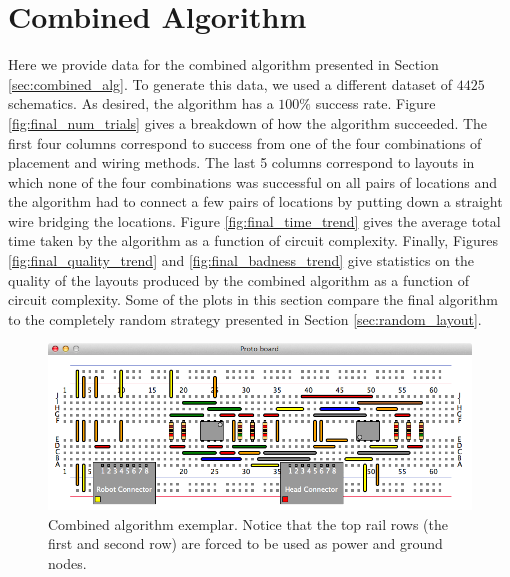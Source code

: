 \newpage\section{Combined Algorithm}
\label{sec:combined_algorithm}

Here we provide data for the combined algorithm presented in Section
\ref{sec:combined_alg}. To generate this data, we used a different dataset of
$4425$ schematics. As desired, the algorithm has a $100\%$ success rate.
Figure \ref{fig:final_num_trials} gives a breakdown of how the algorithm
succeeded. The first four columns correspond to success from one of the four
combinations of placement and wiring methods. The last 5 columns correspond to
layouts in which none of the four combinations was successful on all pairs of
locations and the algorithm had to connect a few pairs of locations by putting
down a straight wire bridging the locations. Figure
\ref{fig:final_time_trend} gives the average total time taken by the algorithm
as a function of circuit complexity. Finally, Figures
\ref{fig:final_quality_trend} and \ref{fig:final_badness_trend}
give statistics on the quality of the layouts produced by the combined algorithm
as a function of circuit complexity. Some of the plots in this section compare
the final algorithm to the completely random strategy
presented in Section \ref{sec:random_layout}.

\begin{figure}[H]
\begin{center}
\includegraphics[width=\textwidth]{Images/exemplar_combined_algorithm.png}
\caption[Combined algorithm exemplar]{Combined algorithm exemplar. Notice that
the top rail rows (the first and second row) are forced to be used as power and
ground nodes.}
\end{center}
\end{figure}

